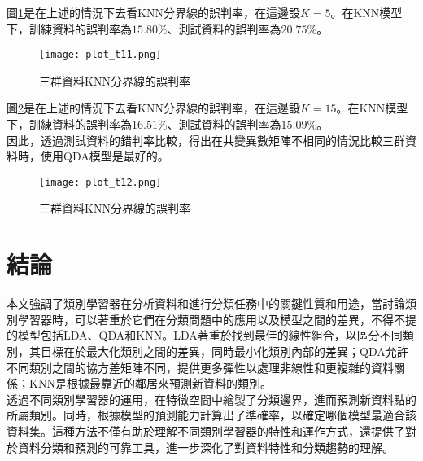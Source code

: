 \documentclass[12pt, a4paper]{article}
\begin{document}
\begin{enumerate}
圖\;\ref{fig:plot_t11.png}\;是在上述的情況下去看\;KNN\;分界線的誤判率，在這邊設\;$K=5$\;。在KNN模型下，訓練資料的誤判率為\;$15.80\%$\;、測試資料的誤判率為\;$20.75\%$\;。
\begin{figure}[h]
\centering
\texttt{[image: plot\_t11.png]}
\caption{三群資料KNN分界線的誤判率}
\label{fig:plot_t11.png}
\end{figure}

圖\;\ref{fig:plot_t12.png}\;是在上述的情況下去看\;KNN\;分界線的誤判率，在這邊設\;$K=15$\;。在KNN模型下，訓練資料的誤判率為\;$16.51\%$\;、測試資料的誤判率為\;$15.09\%$\;。\\
因此，透過測試資料的錯判率比較，得出在共變異數矩陣不相同的情況比較三群資料時，使用QDA模型是最好的。
\begin{figure}[H]
\centering
\texttt{[image: plot\_t12.png]}
\caption{三群資料KNN分界線的誤判率}
\label{fig:plot_t12.png}
\end{figure}

\end{enumerate}

\section{結論}
本文強調了類別學習器在分析資料和進行分類任務中的關鍵性質和用途，當討論類別學習器時，可以著重於它們在分類問題中的應用以及模型之間的差異，不得不提的模型包括LDA、QDA和KNN。LDA著重於找到最佳的線性組合，以區分不同類別，其目標在於最大化類別之間的差異，同時最小化類別內部的差異；QDA允許不同類別之間的協方差矩陣不同，提供更多彈性以處理非線性和更複雜的資料關係；KNN是根據最靠近的鄰居來預測新資料的類別。\\
透過不同類別學習器的運用，在特徵空間中繪製了分類邊界，進而預測新資料點的所屬類別。同時，根據模型的預測能力計算出了準確率，以確定哪個模型最適合該資料集。這種方法不僅有助於理解不同類別學習器的特性和運作方式，還提供了對於資料分類和預測的可靠工具，進一步深化了對資料特性和分類趨勢的理解。
\end{document}
